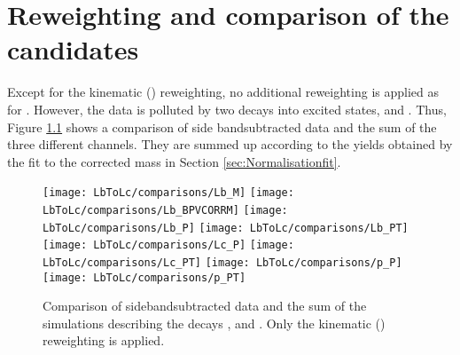\chapter{Reweighting and comparison of the \LbToLcmunu candidates}
\label{app:Reweight_Lc}
Except for the kinematic \pt(\Lb) reweighting, no additional reweighting is applied as for \LbToDpmunu. 
However, the data is polluted by two decays into excited states,  and . 
Thus, Figure \ref{fig:reweight_Lc_app} shows a comparison of side bandsubtracted data and the sum of the three different channels.
They are summed up according to the yields obtained by the fit to the corrected \Lb mass in Section \ref{sec:Normalisationfit}.
\begin{figure}[hptb]
	\centering
  	\texttt{[image: LbToLc/comparisons/Lb\_M]}
  	\texttt{[image: LbToLc/comparisons/Lb\_BPVCORRM]}
  	\texttt{[image: LbToLc/comparisons/Lb\_P]}
  	\texttt{[image: LbToLc/comparisons/Lb\_PT]}
  	\texttt{[image: LbToLc/comparisons/Lc\_P]}
  	\texttt{[image: LbToLc/comparisons/Lc\_PT]}
  	\texttt{[image: LbToLc/comparisons/p\_P]}
  	\texttt{[image: LbToLc/comparisons/p\_PT]}
	\caption{Comparison of sidebandsubtracted data and the sum of the simulations describing the decays \LcTopKpi,  and . Only the kinematic \pt(\Lb) reweighting is applied.}
    \label{fig:reweight_Lc_app}
\end{figure}

